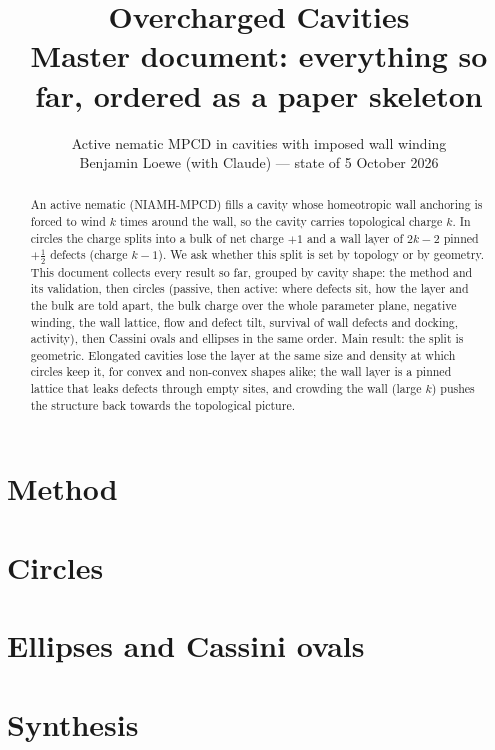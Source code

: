 \documentclass[11pt,a4paper]{article}
\title{Overcharged Cavities\\[4pt]\large Master document: everything so far, ordered as a paper skeleton}
\author{Active nematic MPCD in cavities with imposed wall winding\\[2pt]
\small Benjamin Loewe (with Claude) --- state of 5 October 2026}
\date{}
\newcommand{\half}{\tfrac12}
\begin{document}
\maketitle
\begin{abstract}
An active nematic (NIAMH-MPCD) fills a cavity whose homeotropic wall anchoring is forced to wind $k$ times around the wall,
so the cavity carries topological charge $k$. In circles the charge splits into a bulk of net charge $+1$ and a wall layer of
$2k-2$ pinned $+\half$ defects (charge $k-1$). We ask whether this split is set by topology or by geometry. This document
collects every result so far, grouped by cavity shape: the method and its validation, then circles (passive, then active:
where defects sit, how the layer and the bulk are told apart, the bulk charge over the whole parameter plane, negative
winding, the wall lattice, flow and defect tilt, survival of wall defects and docking, activity), then Cassini ovals and
ellipses in the same order. Main result: the split is geometric. Elongated cavities lose the layer at the same size and
density at which circles keep it, for convex and non-convex shapes alike; the wall layer is a pinned lattice that leaks
defects through empty sites, and crowding the wall (large $k$) pushes the structure back towards the topological picture.
\end{abstract}

\tableofcontents
\clearpage



\part{Method}




\part{Circles}









\part{Ellipses and Cassini ovals}









\part{Synthesis}






\appendix


\end{document}
